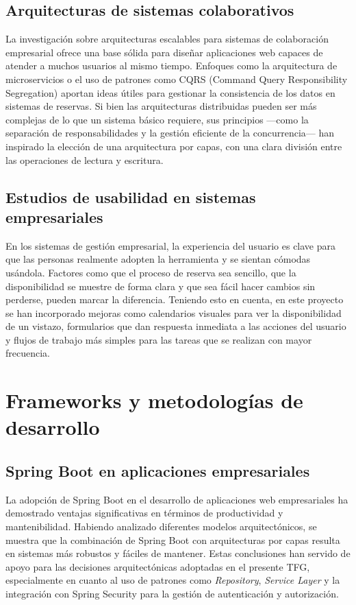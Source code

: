 \subsection{Arquitecturas de sistemas colaborativos}\label{arquitecturas-sistemas-colaborativos}
La investigación sobre arquitecturas escalables para sistemas de colaboración empresarial ofrece una base sólida para diseñar aplicaciones web capaces de atender a muchos usuarios al mismo tiempo. Enfoques como la arquitectura de microservicios o el uso de patrones como CQRS (Command Query Responsibility Segregation) aportan ideas útiles para gestionar la consistencia de los datos en sistemas de reservas.
Si bien las arquitecturas distribuidas pueden ser más complejas de lo que un sistema básico requiere, sus principios —como la separación de responsabilidades y la gestión eficiente de la concurrencia— han inspirado la elección de una arquitectura por capas, con una clara división entre las operaciones de lectura y escritura.

\subsection{Estudios de usabilidad en sistemas empresariales}\label{estudios-usuabilidad-sistemas-empresariales}
En los sistemas de gestión empresarial, la experiencia del usuario es clave para que las personas realmente adopten la herramienta y se sientan cómodas usándola. Factores como que el proceso de reserva sea sencillo, que la disponibilidad se muestre de forma clara y que sea fácil hacer cambios sin perderse, pueden marcar la diferencia.
Teniendo esto en cuenta, en este proyecto se han incorporado mejoras como calendarios visuales para ver la disponibilidad de un vistazo, formularios que dan respuesta inmediata a las acciones del usuario y flujos de trabajo más simples para las tareas que se realizan con mayor frecuencia.

\section{Frameworks y metodologías de desarrollo}\label{frameworks-metodologias-desarrollo}
\subsection{Spring Boot en aplicaciones empresariales}\label{spring-boot-aplicaciones-empresariales}
La adopción de Spring Boot en el desarrollo de aplicaciones web empresariales ha demostrado ventajas significativas en términos de productividad y mantenibilidad. Habiendo analizado diferentes modelos arquitectónicos, se muestra que la combinación de Spring Boot con arquitecturas por capas resulta en sistemas más robustos y fáciles de mantener.
Estas conclusiones han servido de apoyo para las decisiones arquitectónicas adoptadas en el presente TFG, especialmente en cuanto al uso de patrones como \emph{Repository}, \emph{Service Layer} y la integración con Spring Security para la gestión de autenticación y autorización.

